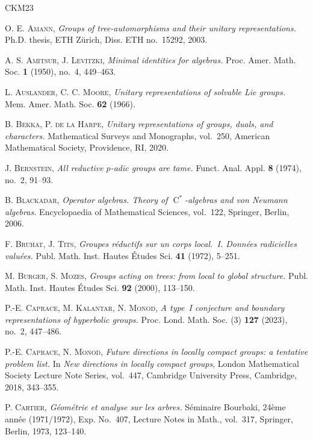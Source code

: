 \documentclass[11pt]{amsart}
\numberwithin{equation}{section}
\newcommand{\Cstar}{\operatorname{C}^*}
\theoremstyle{definition}
\begin{document}
\begin{thebibliography}{CKM23}

     \textsc{O. E. Amann}, \textit{Groups of tree-automorphisms and their unitary representations.} Ph.D. thesis, ETH Z\"urich, Diss. ETH no.~15292, 2003.

     \textsc{A. S. Amitsur, J. Levitzki}, \textit{Minimal identities for algebras.} Proc. Amer. Math. Soc. \textbf{1} (1950), no.~4, 449--463.

     \textsc{L. Auslander, C. C. Moore}, \textit{Unitary representations of solvable Lie groups.} Mem. Amer. Math. Soc. \textbf{62} (1966).

     \textsc{B. Bekka, P. de la Harpe}, \textit{Unitary representations of groups, duals, and characters.} Mathematical Surveys and Monographs, vol.~250, American Mathematical Society, Providence, RI, 2020.

     \textsc{J. Bernstein}, \textit{All reductive $p$-adic groups are tame.} Funct. Anal. Appl. \textbf{8} (1974), no.~2, 91--93.

     \textsc{B. Blackadar}, \textit{Operator algebras. Theory of $\Cstar$-algebras and von Neumann algebras.} Encyclopaedia of Mathematical Sciences, vol.~122, Springer, Berlin, 2006.

     \textsc{F. Bruhat, J. Tits}, \textit{Groupes r\'eductifs sur un corps local.~\textup{I}. Donn\'ees radicielles valu\'ees.} Publ. Math. Inst. Hautes \'Etudes Sci. \textbf{41} (1972), 5--251.

     \textsc{M. Burger, S. Mozes}, \textit{Groups acting on trees: from local to global structure.} Publ. Math. Inst. Hautes \'Etudes Sci. \textbf{92} (2000), 113--150.

     \textsc{P.-E. Caprace, M. Kalantar, N. Monod}, \textit{A type~\textup{I} conjecture and boundary representations of hyperbolic groups.} Proc. Lond. Math. Soc. (3) \textbf{127} (2023), no.~2, 447--486.

     \textsc{P.-E. Caprace, N. Monod}, \textit{Future directions in locally compact groups: a tentative problem list.} In \textit{New directions in locally compact groups}, London Mathematical Society Lecture Note Series, vol.~447, Cambridge University Press, Cambridge, 2018, 343--355.

     \textsc{P. Cartier}, \textit{G\'eom\'etrie et analyse sur les arbres.} S\'eminaire Bourbaki, 24\`eme ann\'ee (1971/1972), Exp. No.~407, Lecture Notes in Math., vol.~317, Springer, Berlin, 1973, 123--140.


\end{thebibliography}
\end{document}
